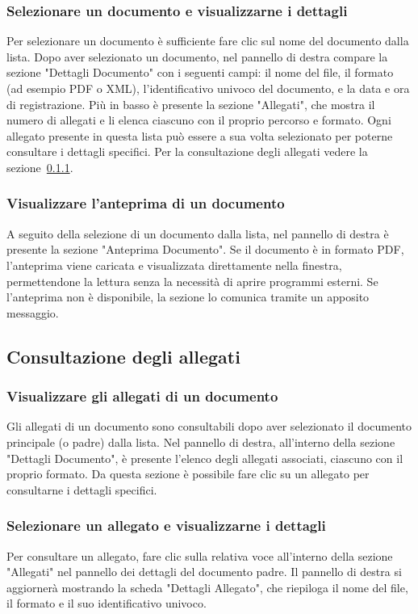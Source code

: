 \documentclass[a4paper,12pt]{article}
\begin{document}
            \subsubsection{Selezionare un documento e visualizzarne i dettagli}
            Per selezionare un documento è sufficiente fare clic sul nome del documento dalla lista. 
            Dopo aver selezionato un documento, nel pannello di destra compare la sezione "Dettagli Documento" con i seguenti campi: il nome del file, il formato (ad esempio PDF o XML), l'identificativo univoco del documento, e la data e ora di registrazione. Più in basso è presente la sezione "Allegati", che mostra il numero di allegati e li elenca ciascuno con il proprio percorso e formato.
            Ogni allegato presente in questa lista può essere a sua volta selezionato per poterne consultare i dettagli specifici. Per la consultazione degli allegati vedere la sezione~\ref{sec:allegati}.

            \subsubsection{Visualizzare l'anteprima di un documento}
            A seguito della selezione di un documento dalla lista, nel pannello di destra è presente la sezione "Anteprima Documento". Se il documento è in formato PDF, l'anteprima viene caricata e visualizzata direttamente nella finestra, permettendone la lettura senza la necessità di aprire programmi esterni.
            Se l'anteprima non è disponibile, la sezione lo comunica tramite un apposito messaggio.
        \subsection{Consultazione degli allegati}
            \subsubsection{Visualizzare gli allegati di un documento}
            \label{sec:allegati}
            Gli allegati di un documento sono consultabili dopo aver selezionato il documento principale (o padre) dalla lista. Nel pannello di destra, all'interno della sezione "Dettagli Documento", è presente l'elenco degli allegati associati, ciascuno con il proprio formato. Da questa sezione è possibile fare clic su un allegato per consultarne i dettagli specifici.
        
            \subsubsection{Selezionare un allegato e visualizzarne i dettagli}
            Per consultare un allegato, fare clic sulla relativa voce all'interno della sezione "Allegati" nel pannello dei dettagli del documento padre. Il pannello di destra si aggiornerà mostrando la scheda "Dettagli Allegato", che riepiloga il nome del file, il formato e il suo identificativo univoco.
\end{document}
